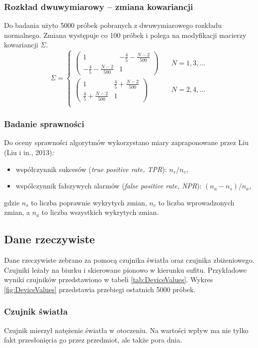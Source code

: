 \subsubsection*{Rozkład dwuwymiarowy -- zmiana kowariancji}
Do badania użyto 5000 próbek pobranych z dwuwymiarowego rozkładu normalnego.
Zmiana występuje co 100 próbek
i polega na modyfikacji macierzy kowariancji $\Sigma$.
\[ \Sigma =
  \begin{cases}
    \begin{pmatrix} 1 & -\frac{4}{5} - \frac{N-2}{500} \\ -\frac{4}{5} - \frac{N-2}{500} & 1 \end{pmatrix} & \quad N = 1,3,\ldots\\
    \begin{pmatrix} 1 & \frac{4}{5} + \frac{N-2}{500} \\ \frac{4}{5} + \frac{N-2}{500} & 1 \end{pmatrix} & \quad N = 2,4,\ldots\\
  \end{cases}
\]
\subsubsection*{Badanie sprawności}
Do oceny sprawności algorytmów wykorzystano miary zapraponowane przez Liu (Liu i in., 2013):
\begin{itemize}
  \item współczynnik sukcesów (\textit{true positive rate, TPR}): $n_{s}/n_{c}$,
  \item wspólczynnik fałszywych alarmów (\textit{false positive rate, NPR}): $(n_{a}-n_{s})/n_{a}$,
\end{itemize}
gdzie $n_{s}$ to liczba poprawnie wykrytych zmian, $n_{c}$ to liczba wprowadzonych zmian,
a $n_{a}$ to liczba wszystkich wykrytych zmian.

\subsection*{Dane rzeczywiste}
Dane rzeczywiste zebrano za pomocą czujnika światła oraz czujnika zbiżeniowego.
Czujniki leżały na biurku i skierowane pionowo w kierunku sufitu.
Przykładowe wyniki czujników przedstawiono w tabeli \ref{tab:DeviceValues}.
Wykres \ref{fig:DeviceValues} przedstawia przebiegi ostatnich 5000 próbek.
\subsubsection*{Czujnik światła}
Czujnik mierzył natężenie światła w otoczeniu.
Na wartości wpływ ma nie tylko fakt przesłonięcia go przez przedmiot,
ale także pora dnia.
